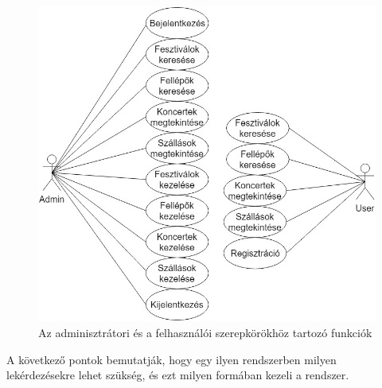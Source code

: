\begin{figure}
\centering
\includegraphics[scale=0.55]{kepek/use_case.jpg}
\caption{Az adminisztrátori és a felhasználói szerepkörökhöz tartozó funkciók}
\label{fig:useCase}
\end{figure}



A következő pontok bemutatják, hogy egy ilyen rendszerben milyen lekérdezésekre lehet szükség, és ezt milyen formában kezeli a rendszer.


